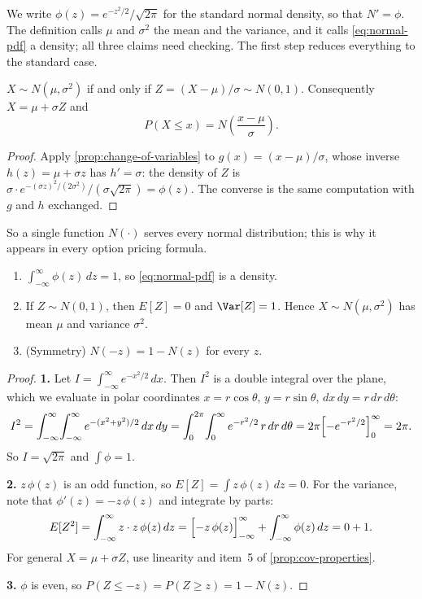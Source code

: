 \suppstart
We write $\phi(z)=e^{-z^{2}/2}/\sqrt{2\pi}$ for the standard normal density, so that $N'=\phi$.
The definition calls $\mu$ and $\sigma^{2}$ the mean and the variance, and it calls \eqref{eq:normal-pdf} a density; all three claims need checking.
The first step reduces everything to the standard case.

\begin{proposition}[Standardisation]\label{prop:standardise}
	$X\sim N(\mu,\sigma^{2})$ if and only if $Z=(X-\mu)/\sigma\sim N(0,1)$.
	Consequently $X=\mu+\sigma Z$ and
	\[
		P(X\le x) = N\!\left(\frac{x-\mu}{\sigma}\right) .
	\]
\end{proposition}

\begin{proof}
	Apply \autoref{prop:change-of-variables} to $g(x)=(x-\mu)/\sigma$, whose inverse $h(z)=\mu+\sigma z$ has $h'=\sigma$:
	the density of $Z$ is $\sigma\cdot e^{-(\sigma z)^{2}/(2\sigma^{2})}/(\sigma\sqrt{2\pi})=\phi(z)$.
	The converse is the same computation with $g$ and $h$ exchanged.
\end{proof}

So a single function $N(\cdot)$ serves every normal distribution; this is why it appears in every option pricing formula.

\begin{proposition}\label{prop:normal-basic}
	\begin{enumerate}[nosep]
		\item $\int_{-\infty}^{\infty}\phi(z)\,dz=1$, so \eqref{eq:normal-pdf} is a density.
		\item If $Z\sim N(0,1)$, then $E[Z]=0$ and $\Var[Z]=1$. Hence $X\sim N(\mu,\sigma^{2})$ has mean $\mu$ and variance $\sigma^{2}$.
		\item (Symmetry) $N(-z)=1-N(z)$ for every $z$.
	\end{enumerate}
\end{proposition}

\begin{proof}
	\textbf{1.} Let $I=\int_{-\infty}^{\infty}e^{-x^{2}/2}\,dx$.
	Then $I^{2}$ is a double integral over the plane, which we evaluate in polar coordinates $x=r\cos\theta$, $y=r\sin\theta$, $dx\,dy=r\,dr\,d\theta$:
	\[
		I^{2}=\int_{-\infty}^{\infty}\!\int_{-\infty}^{\infty}e^{-(x^{2}+y^{2})/2}\,dx\,dy
		=\int_{0}^{2\pi}\!\int_{0}^{\infty}e^{-r^{2}/2}\,r\,dr\,d\theta
		=2\pi\Bigl[-e^{-r^{2}/2}\Bigr]_{0}^{\infty}=2\pi .
	\]
	So $I=\sqrt{2\pi}$ and $\int\phi=1$.

	\textbf{2.} $z\,\phi(z)$ is an odd function, so $E[Z]=\int z\,\phi(z)\,dz=0$.
	For the variance, note that $\phi'(z)=-z\,\phi(z)$ and integrate by parts:
	\[
		E[Z^{2}]=\int_{-\infty}^{\infty}z\cdot z\,\phi(z)\,dz
		=\Bigl[-z\,\phi(z)\Bigr]_{-\infty}^{\infty}+\int_{-\infty}^{\infty}\phi(z)\,dz
		=0+1 .
	\]
	For general $X=\mu+\sigma Z$, use linearity and item~5 of \autoref{prop:cov-properties}.

	\textbf{3.} $\phi$ is even, so $P(Z\le-z)=P(Z\ge z)=1-N(z)$.
\end{proof}

